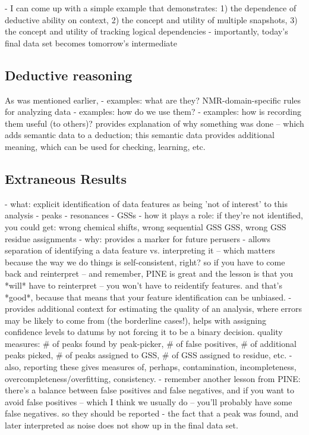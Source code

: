  - I can come up with a simple example that demonstrates: 1) the dependence of
   deductive ability on context, 2) the concept and utility of multiple 
   snapshots, 3) the concept and utility of tracking logical dependencies
 - importantly, today's final data set becomes tomorrow's intermediate


\subsection{Deductive reasoning}

As was mentioned earlier, 
 - examples: what are they?  NMR-domain-specific rules for analyzing data
 - examples: how do we use them?
 - examples: how is recording them useful (to others)?
   provides explanation of why something was done -- which adds semantic data
   to a deduction; this semantic data provides additional meaning, which can
   be used for checking, learning, etc.

\subsection{Extraneous Results}
 - what: explicit identification of data features as being 'not of interest'
   to this analysis
   - peaks
   - resonances
   - GSSs
 - how it plays a role: if they're not identified, you could get: wrong 
   chemical shifts, wrong sequential GSS GSS, wrong GSS residue assignments
 - why: provides a marker for future perusers
 - allows separation of identifying a data feature vs. interpreting it -- which
   matters because the way we do things is self-consistent, right?  
   so if you have to come back and reinterpret -- and remember, PINE is great and the
   lesson is that you *will* have to reinterpret -- you won't have to reidentify
   features.  
   and that's *good*, because that means that your feature identification
   can be unbiased.  
 - provides additional context for estimating the quality of an analysis,
   where errors may be likely to come from (the borderline cases!), helps with
   assigning confidence levels to datums by not forcing it to be a binary 
   decision.  quality measures: \# of peaks found by peak-picker, \# of false
   positives, \# of additional peaks picked, \# of peaks assigned to GSS, 
   \# of GSS assigned to residue, etc.
 - also, reporting these gives measures of, perhaps, contamination,
   incompleteness, overcompleteness/overfitting, consistency.  
 - remember another
   lesson from PINE: there's a balance between false positives and false negatives,
   and if you want to avoid false positives -- which I think we usually do -- 
   you'll probably have some false negatives.  so they should be reported
 - the fact that a peak was found, and later interpreted as noise does 
   not show up in the final data set.

